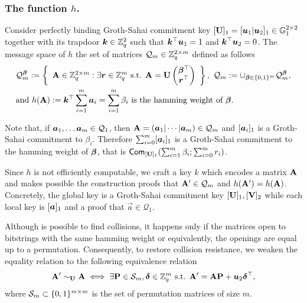 
\subsubsection{The function $h$.} Consider perfectly binding Groth-Sahai commitment key $[\mathbf{{U}}]_1 = [{\boldsymbol{u}}_1|{\boldsymbol{u}}_2]_1\in\mathbb{G}_1^{2\times 2}$ together with its trapdoor ${\boldsymbol{k}}\in\mathbb{Z}_q^2$ such that ${\boldsymbol{k}}^\top{\boldsymbol{u}}_1 = 1$ and ${\boldsymbol{k}}^\top{\boldsymbol{u}}_2 = 0$. The message space of $h$ the set of matrices $\mathcal{Q}_m\in\mathbb{Z}_q^{2\times m}$ defined as follows
\begin{align*}
&\mathcal{Q}_m^{\boldsymbol{\beta}} := \left\{
\begin{array}{c}
\mathbf{{A}} \in \mathbb{Z}_q^{2\times m}:
\exists {\boldsymbol{r}}\in\mathbb{Z}_q^m\text{ s.t. }
{\mathbf{{A}} = \mathbf{{U}}\left(\begin{matrix}{\boldsymbol{\beta}}^\top\\{\boldsymbol{r}}^\top\end{matrix}\right)
}
\end{array}\right\},
\ \mathcal{Q}_m := \cup_{{\boldsymbol{\beta}}\in\{0,1\}^m} \mathcal{Q}_m^{\boldsymbol{\beta}},\\
&\text{and } h(\mathbf{{A}}):= {\boldsymbol{k}}^\top\sum_{i=1}^m{\boldsymbol{a}}_i = \sum_{i=1}^m \beta_i \text{ is the hamming weight of }{\boldsymbol{\beta}}.
\end{align*}

Note that, if ${\boldsymbol{a}}_1,\ldots {\boldsymbol{a}}_m\in\mathcal{Q}_{1}$, then $\matr{A} = (\vec{a}_1\cat\cdots\cat\vecb{a}_m)\in\mathcal{Q}_{m}$ and $[{\boldsymbol{a}}_i]_1$ is a Groth-Sahai commitment to $\beta_i$.
Therefore $\sum_{i=0}^m[{\boldsymbol{a}}_i]_1$ is a Groth-Sahai commitment to the hamming weight of ${\boldsymbol{\beta}}$, that is $\mathsf{Com}_{[\mathbf{{U}}]_1}(\sum_{i=1}^m \beta_i;\sum_{i=0}^m r_i)$.

Since $h$ is not efficiently computable, we craft a key $k$ which encodes a matrix $\mathbf{{A}}$ and makes possible the construction proofs that $\mathbf{{A}}'\in\mathcal{Q}_m$ and $h(\mathbf{{A}}')=h(\mathbf{{A}})$. Concretely, the global key is a Groth-Sahai commitment key $[\mathbf{{U}}]_1,[\mathbf{{V}}]_2$ while each local key is $[{\boldsymbol{a}}]_1$ and a proof that $\vec{a}\in\mathcal{Q}_1$.

Although is possible to find collisions, it happens only if the matrices open to bitstrings with the same hamming weight or equivalently, the openings are equal up to a permutation. Consequently, to restore collision resistance, we weaken the equality relation to the following equivalence relation
$$
\mathbf{{A}}' \sim_{\mathbf{{U}}} \mathbf{{A}} \iff \exists \mathbf{{P}}\in\mathcal{S}_m, {\boldsymbol{\delta}}\in\mathbb{Z}_q^m \text{ s.t. } \mathbf{{A}}' = \mathbf{{A}}\mathbf{{P}} + {\boldsymbol{u}}_2{\boldsymbol{\delta}}^\top,
$$
where $\mathcal{S}_m\subset \{0,1\}^{m\times m}$ is the set of permutation matrices of size $m$.

